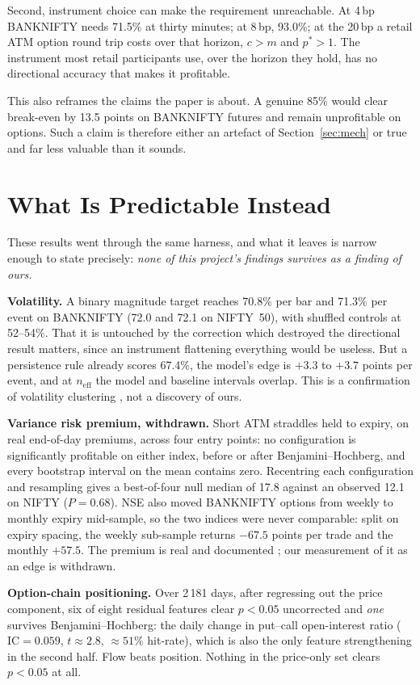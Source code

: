 \documentclass[sigconf,nonacm]{acmart}
\begin{document}
Second, instrument choice can make the requirement unreachable. At 4\,bp
BANKNIFTY needs 71.5\% at thirty minutes; at 8\,bp, 93.0\%; at the 20\,bp a
retail ATM option round trip costs over that horizon, $c > m$ and $p^{\ast} > 1$.
The instrument most retail participants use, over the horizon they hold, has no
directional accuracy that makes it profitable.

This also reframes the claims the paper is about. A genuine 85\% would clear
break-even by 13.5 points on BANKNIFTY futures and remain unprofitable on
options. Such a claim is therefore either an artefact of
Section~\ref{sec:mech} or true and far less valuable than it sounds.

\section{What Is Predictable Instead}

These results went through the same harness, and what it leaves is narrow
enough to state precisely: \emph{none of this project's findings survives as a
finding of ours.}

\textbf{Volatility.} A binary magnitude target reaches 70.8\% per bar and
71.3\% per event on BANKNIFTY (72.0 and 72.1 on NIFTY~50), with shuffled
controls at 52--54\%. That it is untouched by the correction which destroyed the
directional result matters, since an instrument flattening everything would be
useless. But a persistence rule already scores 67.4\%, the model's edge is
$+3.3$ to $+3.7$ points per event, and at $n_{\text{eff}}$ the model and
baseline intervals overlap. This is a confirmation of volatility clustering
\cite{engle1982,bollerslev1986}, not a discovery of ours.

\textbf{Variance risk premium, withdrawn.} Short ATM straddles held to expiry,
on real end-of-day premiums, across four entry points: no configuration is
significantly profitable on either index, before or after Benjamini--Hochberg,
and every bootstrap interval on the mean contains zero. Recentring each
configuration and resampling gives a best-of-four null median of 17.8 against an
observed 12.1 on NIFTY ($P=0.68$). NSE also moved BANKNIFTY options from weekly
to monthly expiry mid-sample, so the two indices were never comparable: split on
expiry spacing, the weekly sub-sample returns $-67.5$ points per trade and the
monthly $+57.5$. The premium is real and documented \cite{carr2009,bakshi2003};
our measurement of it as an edge is withdrawn.

\textbf{Option-chain positioning.} Over 2\,181 days, after regressing out the
price component, six of eight residual features clear $p<0.05$ uncorrected and
\emph{one} survives Benjamini--Hochberg: the daily change in put--call
open-interest ratio ($\text{IC}=0.059$, $t\approx 2.8$, $\approx 51\%$
hit-rate), which is also the only feature strengthening in the second half.
Flow beats position. Nothing in the price-only set clears $p<0.05$ at all.
\end{document}
